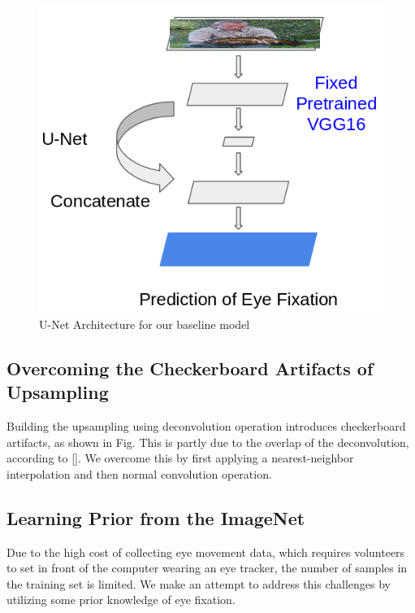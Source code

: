 \documentclass[10pt,twocolumn,letterpaper]{article}
\begin{document}
 \begin{figure}
	\begin{center}
		\includegraphics[width=\columnwidth]{figures/architecture_bl.png}
		
	\end{center}
	\caption{U-Net Architecture for our baseline model}
	\label{fig:short}
\end{figure}

\subsection{Overcoming the Checkerboard Artifacts of Upsampling}
Building the upsampling using deconvolution operation introduces checkerboard artifacts, as shown in Fig. This is partly due to the overlap of the deconvolution, according to []. We overcome this by first applying a nearest-neighbor interpolation and then normal convolution operation.

\subsection{Learning Prior from the ImageNet}

 Due to the high cost of collecting eye movement data, which requires volunteers to set in front of the computer wearing an eye tracker, the number of samples in the training set is limited. We make an attempt to address this challenges by utilizing some prior knowledge of eye fixation.
 
\end{document}
